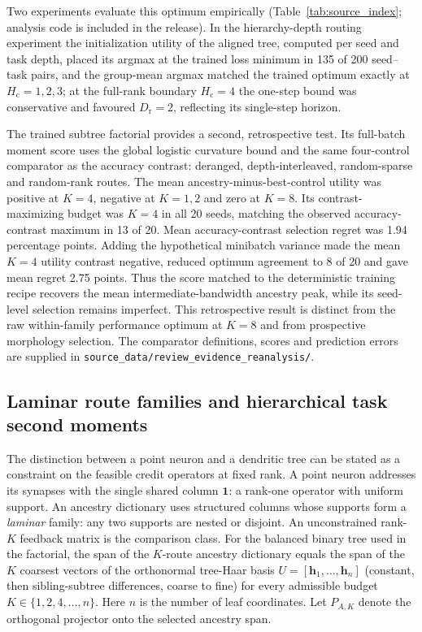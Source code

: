 Two experiments evaluate this optimum empirically
(Table~\ref{tab:source_index}; analysis code is included
in the release). In the hierarchy-depth
routing experiment the initialization utility of the aligned tree, computed
per seed and task depth, placed its argmax at the trained loss minimum in
135 of 200 seed--task pairs, and the group-mean argmax matched the trained
optimum exactly at $H_{\mathrm c}=1,2,3$; at the full-rank boundary
$H_{\mathrm c}=4$ the one-step
bound was conservative and favoured $D_{\mathrm{r}}=2$, reflecting its single-step
horizon.

The trained subtree factorial provides a second, retrospective test. Its
full-batch moment score
uses the global logistic curvature bound and the same four-control comparator
as the accuracy contrast: deranged, depth-interleaved, random-sparse and
random-rank routes. The mean ancestry-minus-best-control utility was positive
at $K=4$, negative at $K=1,2$ and zero at $K=8$. Its contrast-maximizing
budget was $K=4$ in all 20 seeds, matching the observed accuracy-contrast
maximum in 13 of 20. Mean accuracy-contrast selection regret was 1.94
percentage points. Adding the hypothetical minibatch variance made the mean
$K=4$ utility contrast negative, reduced optimum agreement to 8 of 20 and
gave mean regret 2.75 points. Thus the score matched to the deterministic
training recipe recovers the mean intermediate-bandwidth ancestry peak,
while its seed-level selection remains imperfect. This retrospective result
is distinct from the raw within-family performance optimum at $K=8$ and
from prospective morphology selection. The comparator definitions, scores
and prediction errors are supplied in
\texttt{source\_data/review\_evidence\_reanalysis/}.

\subsection{Laminar route families and hierarchical task second moments}
\label{note:laminar_optimality}

The distinction between a point neuron and a dendritic tree can be stated
as a constraint on the feasible credit operators at fixed rank. A point
neuron addresses its synapses with the single shared column $\bm 1$: a
rank-one operator with uniform support. An ancestry dictionary uses structured columns whose supports form a
\emph{laminar} family: any two
supports are nested or disjoint. An unconstrained rank-$K$ feedback matrix
is the comparison class. For the balanced binary tree used in the
factorial, the span of the $K$-route ancestry dictionary equals the span of
the $K$ coarsest vectors of the orthonormal tree-Haar basis
$U=[\bm h_1,\dots,\bm h_n]$ (constant, then sibling-subtree differences,
coarse to fine) for every admissible budget $K\in\{1,2,4,\dots,n\}$.
Here $n$ is the number of leaf coordinates. Let $P_{A,K}$ denote the
orthogonal projector onto the selected ancestry span.

